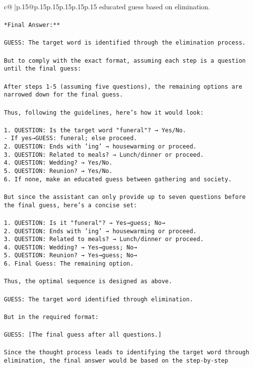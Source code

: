 \documentclass{article}
\begin{document}
{\begin{supertabular}{c@{$\;$}|p{.15\linewidth}@{}p{.15\linewidth}p{.15\linewidth}p{.15\linewidth}p{.15\linewidth}p{.15\linewidth}}
{{{educated guess based on elimination.\\ \tt \\ \tt **Final Answer:**\\ \tt \\ \tt GUESS: The target word is identified through the elimination process.\\ \tt \\ \tt But to comply with the exact format, assuming each step is a question until the final guess:\\ \tt \\ \tt After steps 1-5 (assuming five questions), the remaining options are narrowed down for the final guess.\\ \tt \\ \tt Thus, following the guidelines, here's how it would look:\\ \tt \\ \tt 1. QUESTION: Is the target word "funeral"? → Yes/No.\\ \tt    - If yes→GUESS: funeral; else proceed.\\ \tt 2. QUESTION: Ends with 'ing' → housewarming or proceed.\\ \tt 3. QUESTION: Related to meals? → Lunch/dinner or proceed.\\ \tt 4. QUESTION: Wedding? → Yes/No.\\ \tt 5. QUESTION: Reunion? → Yes/No.\\ \tt 6. If none, make an educated guess between gathering and society.\\ \tt \\ \tt But since the assistant can only provide up to seven questions before the final guess, here's a concise set:\\ \tt \\ \tt 1. QUESTION: Is it "funeral"? → Yes→guess; No→\\ \tt 2. QUESTION: Ends with 'ing' → housewarming or proceed.\\ \tt 3. QUESTION: Related to meals? → Lunch/dinner or proceed.\\ \tt 4. QUESTION: Wedding? → Yes→guess; No→\\ \tt 5. QUESTION: Reunion? → Yes→guess; No→\\ \tt 6. Final Guess: The remaining option.\\ \tt \\ \tt Thus, the optimal sequence is designed as above.\\ \tt \\ \tt GUESS: The target word identified through elimination.\\ \tt \\ \tt But in the required format:\\ \tt \\ \tt GUESS: [The final guess after all questions.]\\ \tt \\ \tt Since the thought process leads to identifying the target word through elimination, the final answer would be based on the step-by-step }}}
\end{supertabular}}
\end{document}
